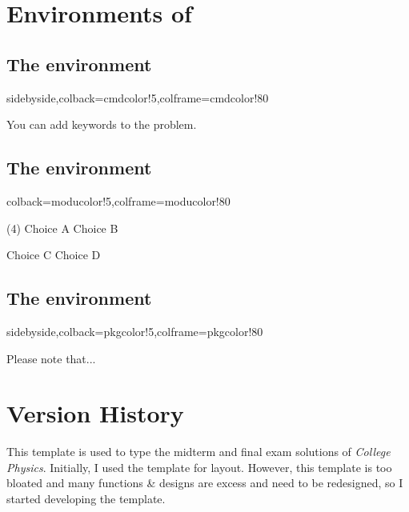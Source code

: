 \documentclass[ans]{litesolution}
\begin{document}
\section{Environments of }
\subsection{The  environment}
\begin{tcblisting}{sidebyside,colback=cmdcolor!5,colframe=cmdcolor!80}
\begin{problem}[Keywords]
  You can add keywords to the problem.
\end{problem}
\end{tcblisting}

\subsection{The  environment}
\begin{tcblisting}{colback=moducolor!5,colframe=moducolor!80}
\begin{solution}\leavevmode
    \begin{tasks}(4)
        \task Choice A   Choice B
        \addtocounter{task}{1}        \task Choice C  \task Choice D
    \end{tasks}
\end{solution}
\end{tcblisting}

\subsection{The  environment}
\begin{tcblisting}{sidebyside,colback=pkgcolor!5,colframe=pkgcolor!80}
\begin{note}
    Please note that...
\end{note}
\end{tcblisting}

\section{Version History}
This template is used to type the midterm and final exam solutions of \emph{College Physics}. Initially, I used the \href{https://github.com/Azure1210/VividBooK}{} template for layout. However, this template is too bloated and many functions \& designs are excess and need to be redesigned, so I started developing the  template.
\end{document}
